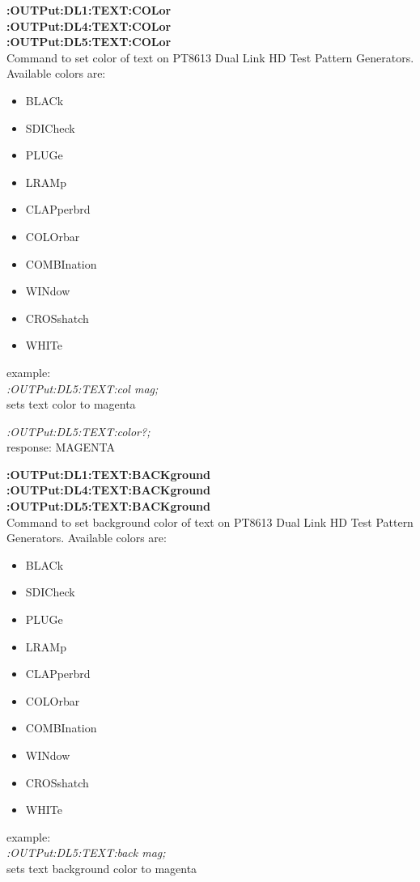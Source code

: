 \textbf{:OUTPut:DL1:TEXT:COLor}\\
\textbf{:OUTPut:DL4:TEXT:COLor}\\
\textbf{:OUTPut:DL5:TEXT:COLor}\\
Command to set color of text on PT8613 Dual Link HD Test Pattern Generators. Available colors are:

\begin{itemize}
\item BLACk
\item SDICheck
\item PLUGe
\item LRAMp
\item CLAPperbrd
\item COLOrbar
\item COMBInation
\item WINdow
\item CROSshatch
\item WHITe
\end{itemize}

example:\\
\textit{:OUTPut:DL5:TEXT:col mag;}\\
sets text color to magenta

\textit{:OUTPut:DL5:TEXT:color?;}\\     
response: MAGENTA

\textbf{:OUTPut:DL1:TEXT:BACKground}\\
\textbf{:OUTPut:DL4:TEXT:BACKground}\\
\textbf{:OUTPut:DL5:TEXT:BACKground}\\

Command to set background color of text on PT8613 Dual Link HD Test Pattern Generators. Available colors are:

\begin{itemize}
\item BLACk
\item SDICheck
\item PLUGe
\item LRAMp
\item CLAPperbrd
\item COLOrbar
\item COMBInation
\item WINdow
\item CROSshatch
\item WHITe
\end{itemize}

example:\\
\textit{:OUTPut:DL5:TEXT:back mag;}\\    
sets text background color to magenta

